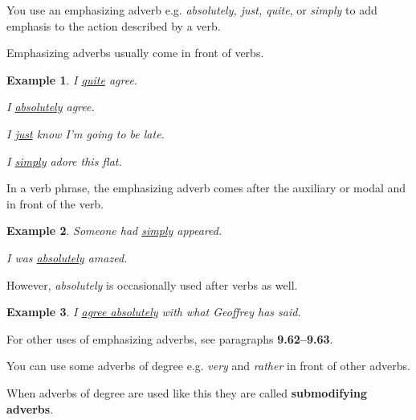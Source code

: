 \documentclass[oneside]{book}
\numberwithin{equation}{section}
\newtheorem{example}{Example}[section]
\begin{document}
%
\noindent{} You use an emphasizing adverb e.g. \textit{absolutely, just, quite}, or \textit{simply} to add emphasis to the action described by a verb.

Emphasizing adverbs usually come in front of verbs.
\begin{example}
    I \underline{quite} agree.
    
    I \underline{absolutely} agree.
    
    I \underline{just} know I'm going to be late.
    
    I \underline{simply} adore this flat.
\end{example}
In a verb phrase, the emphasizing adverb comes after the auxiliary or modal and in front of the verb.
\begin{example}
    Someone had \underline{simply} appeared.
    
    I was \underline{absolutely} amazed.
\end{example}
However, \textit{absolutely} is occasionally used after verbs as well.
\begin{example}
    I \underline{agree absolutely} with what Geoffrey has said.
\end{example}
For other uses of emphasizing adverbs, see paragraphs \textbf{9.62--9.63}.

%
\noindent{} You can use some adverbs of degree e.g. \textit{very} and \textit{rather} in front of other adverbs.

When adverbs of degree are used like this they are called \textbf{submodifying adverbs}.
\end{document}
